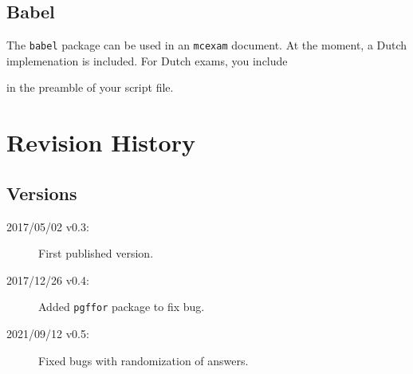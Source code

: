 \documentclass{article}
\begin{document}
  
\subsection{Babel}  

The \verb$babel$ package can be used in an \verb$mcexam$ document. At the moment, a Dutch implemenation is included. For Dutch exams, you include
\begin{code}
\usepackage[dutch]{babel}
\end{code}
in the preamble of your script file.























\section{Revision History}


\subsection{Versions}

\begin{description}

\item[2017/05/02 v0.3:] First published version.

\item[2017/12/26 v0.4:] Added \texttt{pgffor} package to fix bug.

\item[2021/09/12 v0.5:] Fixed bugs with randomization of answers.

\end{description}








 
 
 
\end{document}
